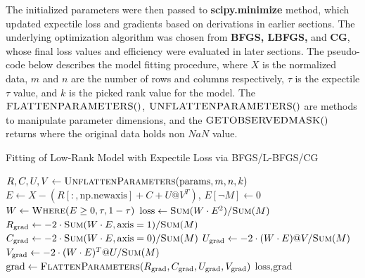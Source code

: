 \documentclass{article}
\begin{document}
The initialized parameters were then passed to \textbf{scipy.minimize} method, which updated expectile loss and gradients based on derivations in earlier sections. The underlying optimization algorithm was chosen from \textbf{BFGS, LBFGS,} and \textbf{CG}, whose final loss values and efficiency were evaluated in later sections. The pseudo-code below describes the model fitting procedure, where $X$ is the normalized data, $m$ and $n$ are the number of rows and columns respectively, $\tau$ is the expectile $\tau$ value, and $k$ is the picked rank value for the model. The $\Call{FLATTENPARAMETERS}$, $\Call{UNFLATTENPARAMETERS}$ are methods to manipulate parameter dimensions, and the $\Call{GETOBSERVEDMASK}$ returns where the original data holds non $NaN$ value.
\begin{algorithm}[ht]
\caption{Fitting of Low-Rank Model with Expectile Loss via BFGS/L-BFGS/CG}
\begin{algorithmic}[1]



{}
    \State $R, C, U, V \gets \Call{UnflattenParameters}{\text{params}, m, n, k}$
    \State $E \gets X - (R[:, \text{np.newaxis}] + C + U @ V^T)$, $E[\neg M] \gets 0$
    \State $W \gets \Call{Where}{E \geq 0, \tau, 1 - \tau}$
    \State $\text{loss} \gets \Call{Sum}{W \cdot E^2} / \Call{Sum}{M}$
    \State $R_{\text{grad}} \gets -2 \cdot \Call{Sum}{W \cdot E, \text{axis}=1} / \Call{Sum}{M}$
    \State $C_{\text{grad}} \gets -2 \cdot \Call{Sum}{W \cdot E, \text{axis}=0} / \Call{Sum}{M}$
    \State $U_{\text{grad}} \gets -2 \cdot (W \cdot E) @ V / \Call{Sum}{M}$
    \State $V_{\text{grad}} \gets -2 \cdot (W \cdot E)^T @ U / \Call{Sum}{M}$
    \State $\text{grad} \gets \Call{FlattenParameters}{R_{\text{grad}}, C_{\text{grad}}, U_{\text{grad}}, V_{\text{grad}}}$
    \State \Return $\text{loss}, \text{grad}$
\EndFunction



\end{algorithmic}
\end{algorithm}
\end{document}
